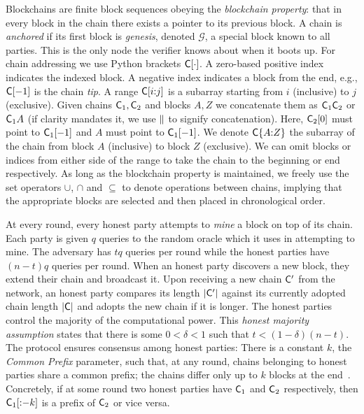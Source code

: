 Blockchains are finite block sequences obeying the \emph{blockchain property}:
that in every block in the chain there exists a pointer to its previous block. A
chain is \emph{anchored} if its first block is \emph{genesis}, denoted $\mathcal{G}$,
a special block known to all parties. This is the only node the verifier knows about
when it boots up. For chain addressing we use Python brackets $\mathsf{C}[\cdot]$. A
zero-based positive index indicates the indexed block.
A negative index indicates a block from the end, e.g., $\mathsf{C}[-1]$ is
the chain \emph{tip}. A range $\mathsf{C}[i{:}j]$ is a subarray starting from
$i$ (inclusive) to $j$ (exclusive). Given chains $\mathsf{C}_1, \mathsf{C}_2$ and blocks
$A, Z$ we concatenate them as $\mathsf{C}_1 \mathsf{C}_2$ or $\mathsf{C}_1 A$ (if clarity
mandates it, we use $\mathbin{\|}$ to signify concatenation). Here,
$\mathsf{C}_2[0]$ must point to $\mathsf{C}_1[-1]$ and $A$ must point to $\mathsf{C}_1[-1]$.
We denote $\mathsf{C}\{A{:}Z\}$ the subarray of the chain from block $A$ (inclusive) to
block $Z$ (exclusive). We can omit blocks or indices from either side of the range to
take the chain to the beginning or end respectively. As long as the blockchain
property is maintained, we freely use the set operators $\cup$, $\cap$ and
$\subseteq$ to denote operations between chains, implying that the appropriate
blocks are selected and then placed in chronological order.

At every round, every honest party attempts to \emph{mine} a block on top of
its chain. Each party is given $q$ queries to the random
oracle which it uses in attempting to mine. The adversary
has $tq$ queries per round while the honest parties have $(n - t)q$ queries per
round. When an honest party discovers a new block, they extend their chain
and broadcast it. Upon receiving a new chain $\mathsf{C}'$ from the
network, an honest party compares its length $|\mathsf{C}'|$ against its currently
adopted chain length $|\mathsf{C}|$ and adopts the new chain if it is longer. The
honest parties control the majority of the computational
power. This \emph{honest majority assumption} states that there
is some $0 < \delta < 1$ such that $t < (1 -  \delta)(n - t)$. The protocol
ensures consensus among honest parties: There is a constant $k$, the
\emph{Common Prefix} parameter, such that, at any round, chains
belonging to honest parties share a common prefix; the chains
differ only up to $k$ blocks at the end~\cite{backbone}.
Concretely, if at some round two honest parties have $\mathsf{C}_1$ and
$\mathsf{C}_2$ respectively, then $\mathsf{C}_1[{:}{-k}]$ is a prefix of $\mathsf{C}_2$
or vice versa.

